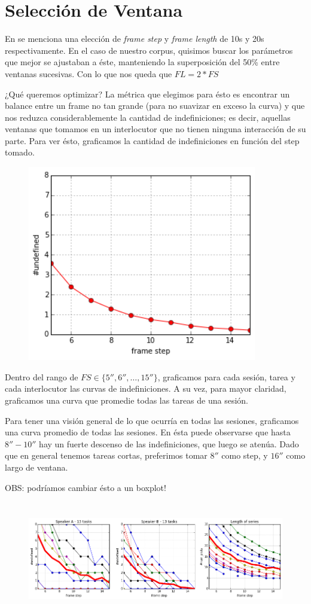 \section{Selección de Ventana}
\label{sec:window_selection}
En \cite{KOU2008.2} se menciona una elección de \emph{frame step} y \emph{frame length} de 10s y 20s respectivamente. En el caso de nuestro corpus, quisimos buscar los parámetros que mejor se ajustaban a éste, manteniendo la superposición del 50\% entre ventanas sucesivas. Con lo que nos queda que $FL = 2 * FS$

¿Qué queremos optimizar? La métrica que elegimos para ésto es encontrar un balance entre un frame no tan grande (para no suavizar en exceso la curva) y que nos reduzca considerablemente la cantidad de indefiniciones; es decir, aquellas ventanas que tomamos en un interlocutor que no tienen ninguna interacción de su parte. Para ver ésto, graficamos la cantidad de indefiniciones en función del step tomado.

\begin{figure}
\centering
\includegraphics[width=10cm]{images/window_selection.png}
\end{figure}



Dentro del rango de $FS \in \{5'',6'', \ldots ,15'' \}$, graficamos para cada sesión, tarea y cada interlocutor las curvas de indefiniciones. A su vez, para mayor claridad, graficamos una curva que promedie todas las tareas de una sesión.


Para tener una visión general de lo que ocurría en todas las sesiones, graficamos una curva promedio de todas las sesiones. En ésta puede observarse que hasta $8''-10''$ hay un fuerte descenso de las indefiniciones, que luego se atenúa. Dado que en general tenemos tareas cortas, preferimos tomar $8''$ como step, y $16''$ como largo de ventana.

OBS: podríamos cambiar ésto a un boxplot!

\begin{figure}
\centering
\includegraphics[height=5cm]{images/window_selection_for_session.png}
\end{figure}
